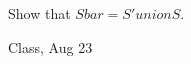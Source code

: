 \begin{samepage}
\begin{ex}
Show that $S bar = S' union S$.
\end{ex}
\begin{source}
Class, Aug 23
\end{source}
\end{samepage}
